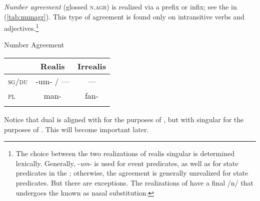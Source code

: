 \documentclass[output=paper,
modfonts
]{LSP/langsci}
\begin{document}
\begin{exe}
\begin{xlist}
\emph{Number agreement} (glossed \textsc{n.agr)} is realized via a
prefix or infix; see the  in (\ref{tab:numagr}). This type of agreement is
found only on intransitive verbs and adjectives.\footnote{The choice
  between the two realizations of realis singular  is
  determined lexically. Generally, -\emph{um}- is used for event
  predicates, as well as for state predicates in the  ;
  otherwise, the agreement is generally unrealized for state predicates.
  But there are exceptions. The realizations of  
  have a final /n/ that undergoes the  known as nasal
  substitution.}

\ea \label{ex:chung:4} Number Agreement\\
	\begin{tabular}{lcc}
		\lsptoprule
		& Realis & Irrealis \\
		\midrule
		\textsc{sg/du} & -um- / --- & --- \\
		\textsc{pl} & man- & fan- \\
		\lspbottomrule
	\end{tabular}
	\label{tab:numagr}
\z

%			

Notice that dual is aligned with  for the purposes of
, but with singular for the purposes of
. This will become important later.


\end{xlist}
\end{exe}
\end{document}
